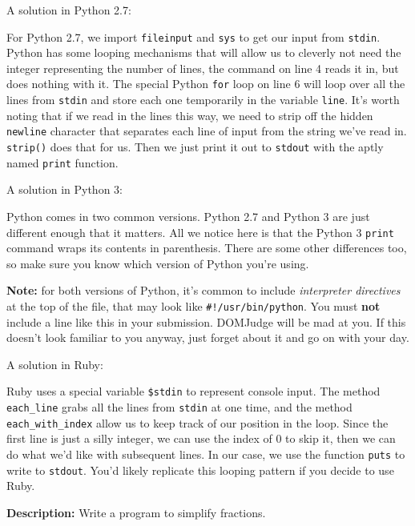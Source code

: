 \documentclass[a4paper]{article}
\begin{document}
A solution in Python 2.7:


For Python 2.7, we import \texttt{fileinput} and \texttt{sys} to get our input from \texttt{stdin}. Python has some looping mechanisms that will allow us to cleverly not need the integer representing the number of lines, the command on line 4 reads it in, but does nothing with it. The special Python \texttt{for} loop on line 6 will loop over all the lines from \texttt{stdin} and store each one temporarily in the variable \texttt{line}. It's worth noting that if we read in the lines this way, we need to strip off the hidden \texttt{newline} character that separates each line of input from the string we've read in. \texttt{strip()} does that for us. Then we just print it out to \texttt{stdout} with the aptly named \texttt{print} function.

A solution in Python 3:


Python comes in two common versions. Python 2.7 and Python 3 are just different enough that it matters. All we notice here is that the Python 3 \texttt{print} command wraps its contents in parenthesis. There are some other differences too, so make sure you know which version of Python you're using. 

\textbf{Note:} for both versions of Python, it's common to include \textit{interpreter directives} at the top of the file, that may look like \texttt{\#!/usr/bin/python}. You must \textbf{not} include a line like this in your submission. DOMJudge will be mad at you. If this doesn't look familiar to you anyway, just forget about it and go on with your day. 
\newpage

A solution in Ruby:


Ruby uses a special variable \texttt{\$stdin} to represent console input. The method \texttt{each\_line} grabs all the lines from \texttt{stdin} at one time, and the method \texttt{each\_with\_index} allow us to keep track of our position in the loop. Since the first line is just a silly integer, we can use the index of 0 to skip it, then we can do what we'd like with subsequent lines. In our case, we use the function \texttt{puts} to write to \texttt{stdout}. You'd likely replicate this looping pattern if you decide to use Ruby.
\newpage

\textbf{Description:} Write a program to simplify fractions.
\end{document}
